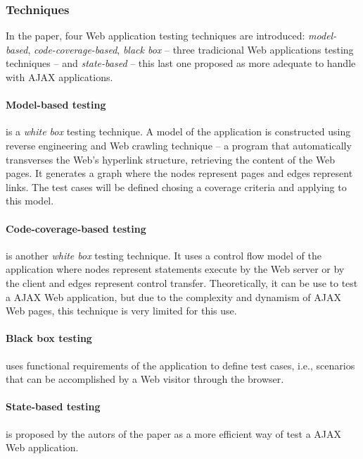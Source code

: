 \documentclass[a4paper]{article}
\begin{document}
\subsubsection{Techniques}
In the paper, four Web application testing techniques are introduced: \emph{model-based}, \emph{code-coverage-based}, \emph{black box} -- three tradicional Web applications testing techniques -- and \emph{state-based} -- this last one proposed as more adequate to handle with AJAX applications.

\paragraph{Model-based testing}

is a \emph{white box} testing technique.
A model of the application is constructed using reverse engineering and Web crawling technique -- a program that automatically transverses the Web's hyperlink structure, retrieving the content of the Web pages.
It generates a graph where the nodes represent pages and edges represent links.
The test cases will be defined chosing a coverage criteria and applying to this model. 

\paragraph{Code-coverage-based testing} 

is another \emph{white box} testing technique. 
It uses a control flow model of the application where nodes represent statements execute by the Web server or by the client and edges represent control transfer.
Theoretically, it can be use to test a AJAX Web application, but due to the complexity and dynamism of AJAX Web pages, this technique is very limited for this use.

\paragraph{Black box testing} 

uses functional requirements of the application to define test cases, i.e., scenarios that can be accomplished by a Web visitor through the browser.

\paragraph{State-based testing}

is proposed by the autors of the paper as a more efficient way of test a AJAX Web application.
\end{document}
